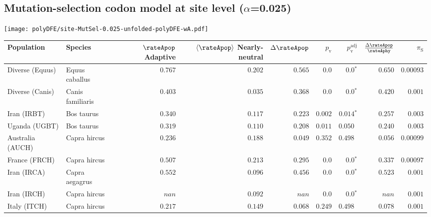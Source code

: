 \subsection{Mutation-selection codon model at site level ($\alpha$=0.025)}
\begin{center}
    \texttt{[image: polyDFE/site-MutSel-0.025-unfolded-polyDFE-wA.pdf]}
    \begin{adjustbox}{width = 1\textwidth}
        \begin{tabular}{|l|l|r|r|r|r|r|r|r|}
            \toprule
            Population & Species & \specialcell{$\rateApop$ \\ Adaptive}                & \specialcell{$\left< \rateApop \right>$ \\ Nearly-neutral}                & $\Delta \rateApop $    & $p_{\mathrm{v}}$ & $p_{\mathrm{v}}^{\mathrm{adj}}$ & $\frac{\Delta\rateApop}{\rateAphy}$ & $\pi_{\textrm{S}}$    \\
            \midrule
            Diverse (Equus)                    & Equus caballus          & $ 0.767$ & $ 0.202$ & $ 0.565$ & $0.0$ & $\bm{0.0{^*}}$ & $ 0.650$ & $0.00093$ \\
            Diverse (Canis)                  & Canis familiaris          & $ 0.403$ & $ 0.035$ & $ 0.368$ & $0.0$ & $\bm{0.0{^*}}$        & $ 0.420$ & $ 0.001$ \\
            Iran (IRBT)               & Bos taurus        & $ 0.340$ & $ 0.117$ & $ 0.223$ & $ 0.002$ & $\bm{ 0.014{^*}}$        & $ 0.257$ & $ 0.003$ \\
            Uganda (UGBT)                  & Bos taurus        & $ 0.319$ & $ 0.110$ & $ 0.208$ & $ 0.011$    & $ 0.050~~$    & $ 0.240$ & $ 0.003$ \\
            Australia (AUCH)                    & Capra hircus      & $ 0.236$ & $ 0.188$ & $ 0.049$ & $ 0.352$    & $ 0.498~~$    & $ 0.056$ & $0.00099$ \\
            France (FRCH)                    & Capra hircus        & $ 0.507$    & $ 0.213$ & $ 0.295$    & $0.0$    & $\bm{0.0{^*}}$    & $ 0.337$    & $0.00097$  \\
            Iran (IRCA)                   & Capra aegagrus        & $ 0.552$ & $ 0.096$ & $ 0.456$ & $0.0$ & $\bm{0.0{^*}}$        & $ 0.523$ & $ 0.001$ \\
            Iran (IRCH)                 & Capra hircus        & $   nan$ & $ 0.092$ & $   nan$ & $0.0$    & $\bm{0.0{^*}}$    & $   nan$ & $ 0.001$ \\
            Italy (ITCH)                    & Capra hircus          & $ 0.217$ & $ 0.149$ & $ 0.068$ & $ 0.249$ & $ 0.498~~$        & $ 0.078$ & $ 0.001$  \\

\end{tabular}
\end{adjustbox}
\end{center}

